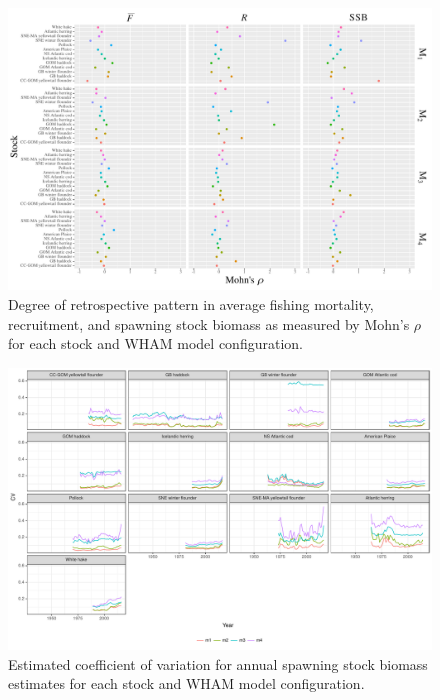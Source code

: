 \documentclass[12pt,letterpaper, leqno]{article}
\begin{document}
\begin{landscape}
\begin{figure}
\caption{Degree of retrospective pattern in average fishing mortality, recruitment, and spawning stock biomass as measured by Mohn's $\rho$ for each stock and WHAM model configuration.}\label{wham_rho_paper_plot}
\begin{center}
\includegraphics[height = 0.9\textheight]{../db/wham_rho_paper_plot.pdf}
\end{center}
\end{figure}

\begin{figure}
\caption{Estimated coefficient of variation for annual spawning stock biomass estimates for each stock and WHAM model configuration.}\label{wham_SSB_CV}
\begin{center}
\includegraphics[height = 0.9\textheight]{wham_SSB_CV.pdf}
\end{center}
\end{figure}


\end{landscape}
\end{document}
